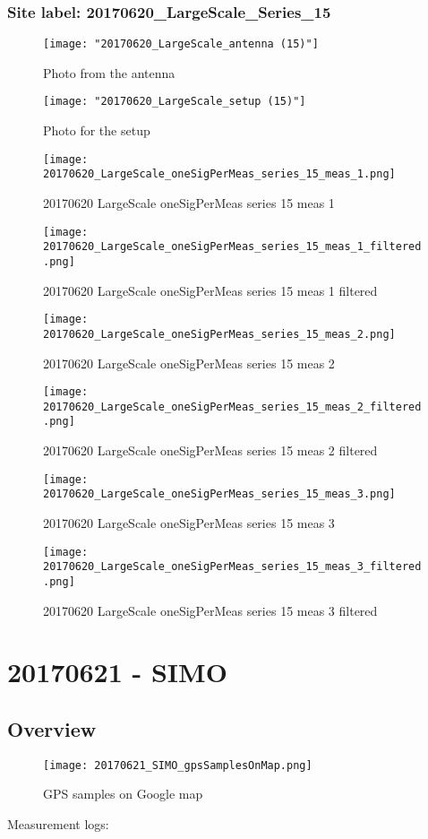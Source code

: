 \subsubsection{Site label: 20170620\_LargeScale\_Series\_15}
\begin{figure}[ht] \caption{Photo from the antenna}
\texttt{[image: "20170620\_LargeScale\_antenna (15)"]}\centering\end{figure}
\begin{figure}[ht] \caption{Photo for the setup}
\texttt{[image: "20170620\_LargeScale\_setup (15)"]}\centering\end{figure}
\begin{figure}[ht] \caption{20170620 LargeScale oneSigPerMeas series 15 meas 1}
\texttt{[image: 20170620\_LargeScale\_oneSigPerMeas\_series\_15\_meas\_1.png]}\centering\end{figure}
\begin{figure}[ht] \caption{20170620 LargeScale oneSigPerMeas series 15 meas 1 filtered}
\texttt{[image: 20170620\_LargeScale\_oneSigPerMeas\_series\_15\_meas\_1\_filtered.png]}\centering\end{figure}
\begin{figure}[ht] \caption{20170620 LargeScale oneSigPerMeas series 15 meas 2}
\texttt{[image: 20170620\_LargeScale\_oneSigPerMeas\_series\_15\_meas\_2.png]}\centering\end{figure}
\begin{figure}[ht] \caption{20170620 LargeScale oneSigPerMeas series 15 meas 2 filtered}
\texttt{[image: 20170620\_LargeScale\_oneSigPerMeas\_series\_15\_meas\_2\_filtered.png]}\centering\end{figure}
\begin{figure}[ht] \caption{20170620 LargeScale oneSigPerMeas series 15 meas 3}
\texttt{[image: 20170620\_LargeScale\_oneSigPerMeas\_series\_15\_meas\_3.png]}\centering\end{figure}
\begin{figure}[ht] \caption{20170620 LargeScale oneSigPerMeas series 15 meas 3 filtered}
\texttt{[image: 20170620\_LargeScale\_oneSigPerMeas\_series\_15\_meas\_3\_filtered.png]}\centering\end{figure}
\clearpage
\section{20170621 - SIMO}
\subsection{Overview}
\begin{figure}[ht] \caption{GPS samples on Google map}
\texttt{[image: 20170621\_SIMO\_gpsSamplesOnMap.png]}\centering\end{figure}
\begin{minipage}{\textwidth} Measurement logs:

 \end{minipage}
\clearpage
